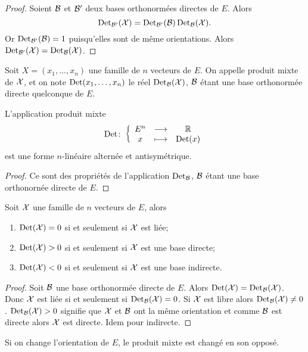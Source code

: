     \begin{proof}
      Soient \(\mathcal{B}\) et \(\mathcal{B}'\) deux bases orthonormées directes de \(E\). Alors
      \begin{equation}
        \operatorname{Det}_{\mathcal{B}'}(\mathcal{X}) = \operatorname{Det}_{\mathcal{B}'}(\mathcal{B}) \operatorname{Det}_{\mathcal{B}}(\mathcal{X}).
      \end{equation}
      Or \(\operatorname{Det}_{\mathcal{B}'}(\mathcal{B})=1\) puisqu'elles sont de même orientations. Alors \(\operatorname{Det}_{\mathcal{B}'}(\mathcal{X}) = \operatorname{Det}_{\mathcal{B}}(\mathcal{X})\).
    \end{proof}
    \begin{defdef}
      Soit \(X=(x_1, \ldots, x_n)\) une famille de \(n\) vecteurs de \(E\). On appelle produit mixte de \(\mathcal{X}\), et on note \(\operatorname{Det}(x_1, \ldots, x_n)\) le réel \(\operatorname{Det}_{\mathcal{B}}(\mathcal{X})\), \(\mathcal{B}\) étant une base orthonormée directe quelconque de \(E\).
    \end{defdef}
    \begin{prop}
      L'application produit mixte
      \begin{equation}
        \operatorname{Det}\colon \left\{\begin{array}{ccc} E^n & \longrightarrow &\mathbb{R}\\ x & \longmapsto & \operatorname{Det}(x) \end{array} \right.
      \end{equation}
      est une forme \(n\)-linéaire alternée et antisymétrique.
    \end{prop}
    \begin{proof}
      Ce sont des propriétés de l'application \(\operatorname{Det}_{\mathcal{B}}\), \(\mathcal{B}\) étant une base orthonornée directe de \(E\).
    \end{proof}
    \begin{prop}
      Soit \(\mathcal{X}\) une famille de \(n\) vecteurs de \(E\), alors
      \begin{enumerate}
        \item \(\operatorname{Det}(\mathcal{X})=0\) si et seulement si \(\mathcal{X}\) est liée;
        \item \(\operatorname{Det}(\mathcal{X})>0\) si et seulement si \(\mathcal{X}\) est une base directe;
        \item \(\operatorname{Det}(\mathcal{X})<0\) si et seulement si \(\mathcal{X}\) est une base indirecte.
      \end{enumerate}
    \end{prop}
    \begin{proof}
      Soit \(\mathcal{B}\) une base orthonormée directe de \(E\). Alors \(\operatorname{Det}(\mathcal{X})=\operatorname{Det}_{\mathcal{B}}(\mathcal{X})\). Donc \(\mathcal{X}\) est liée si et seulement si \(\operatorname{Det}_{\mathcal{B}}(\mathcal{X})=0\). Si \(\mathcal{X}\) est libre alors \(\operatorname{Det}_{\mathcal{B}}(\mathcal{X}) \neq 0\). \(\operatorname{Det}_{\mathcal{B}}(\mathcal{X})>0\) signifie que \(\mathcal{X}\) et \(\mathcal{B}\) ont la même orientation et comme \(\mathcal{B}\) est directe alors \(\mathcal{X}\) est directe. Idem pour indirecte.
    \end{proof}
    \begin{prop}
      Si on change l'orientation de \(E\), le produit mixte est changé en son opposé.
    \end{prop}
